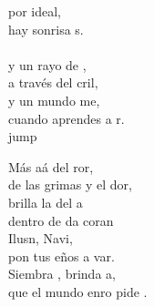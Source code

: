 \begin{cancion}
	por  ideal,\\
	hay  sonrisa s.\\
	\jump\\
	y un rayo de ,\\
	a través del cril,  \\
	y un mundo me,\\
	cuando aprendes a r.\\jump\\
	\begin{chorus}%
	Más aá del ror,\\
	de las grimas y el dor, \\
	brilla la  del a\\
	dentro de da coran\\
	Ilusn, Navi, \\
	pon tus eños a var.\\
	Siembra , brinda a,\\
	que el mundo enro pide .\\
	\end{chorus}%
	\jump\\
\end{cancion}%
